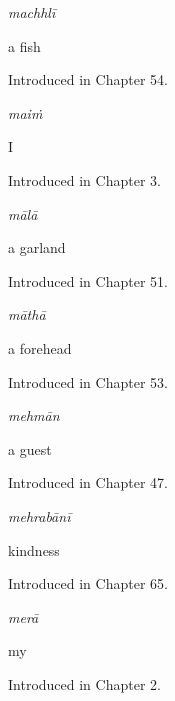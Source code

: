\noindent\begin{minipage}[t]{\linewidth}
\raggedright
\textbf{}\enspace\emph{machhlī}\par
\small a fish\par
\footnotesize Introduced in Chapter 54.
\end{minipage}\par\medskip

\noindent\begin{minipage}[t]{\linewidth}
\raggedright
\textbf{}\enspace\emph{maiṁ}\par
\small I\par
\footnotesize Introduced in Chapter 3.
\end{minipage}\par\medskip

\noindent\begin{minipage}[t]{\linewidth}
\raggedright
\textbf{}\enspace\emph{mālā}\par
\small a garland\par
\footnotesize Introduced in Chapter 51.
\end{minipage}\par\medskip

\noindent\begin{minipage}[t]{\linewidth}
\raggedright
\textbf{}\enspace\emph{māthā}\par
\small a forehead\par
\footnotesize Introduced in Chapter 53.
\end{minipage}\par\medskip

\noindent\begin{minipage}[t]{\linewidth}
\raggedright
\textbf{}\enspace\emph{mehmān}\par
\small a guest\par
\footnotesize Introduced in Chapter 47.
\end{minipage}\par\medskip

\noindent\begin{minipage}[t]{\linewidth}
\raggedright
\textbf{}\enspace\emph{mehrabānī}\par
\small kindness\par
\footnotesize Introduced in Chapter 65.
\end{minipage}\par\medskip

\noindent\begin{minipage}[t]{\linewidth}
\raggedright
\textbf{}\enspace\emph{merā}\par
\small my\par
\footnotesize Introduced in Chapter 2.
\end{minipage}\par\medskip

